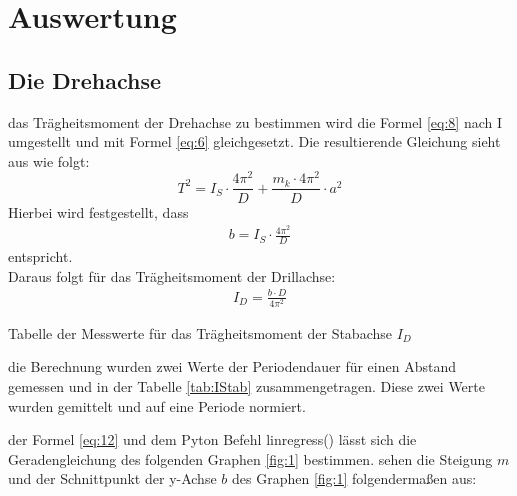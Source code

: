 \section{Auswertung}\justifying

\subsection{Die Drehachse}\justifying %

\justifying das Trägheitsmoment der Drehachse zu bestimmen wird die Formel \eqref{eq:8} nach I umgestellt und mit Formel %
\eqref{eq:6} gleichgesetzt. Die resultierende Gleichung sieht aus wie folgt:
\begin{equation}
T^2 = I_S \cdot \frac{4\pi^2}{D} + \frac{m_k \cdot 4\pi^2}{D} \cdot a^2\label{eq:11}
\end{equation} 
Hierbei wird festgestellt, dass
\begin{align}
    b=I_S \cdot \frac{4\pi^2}{D} \label{eq:12}
\end{align}
entspricht.\\
Daraus folgt für das Trägheitsmoment der Drillachse:
\begin{align}
    I_D = \frac{b \cdot D}{4 \pi^2} \label{eq:13}
\end{align}

\begin{table}[H]
    \centering
    
    \caption{Tabelle der Messwerte für das Trägheitsmoment der Stabachse $I_D$}
    \label{tab:IStab}
\end{table}

 die Berechnung wurden zwei Werte der Periodendauer für einen Abstand gemessen und in der Tabelle \ref{tab:IStab}
zusammengetragen. Diese zwei Werte wurden gemittelt und auf eine Periode normiert.

\justifying der Formel \eqref{eq:12} und dem Pyton Befehl linregress() \cite{numpy} lässt sich die Geradengleichung
des folgenden Graphen \ref{fig:1} bestimmen. 
\justifying sehen die Steigung $m$ und der Schnittpunkt der y-Achse $b$ des Graphen \ref{fig:1} folgendermaßen aus:

